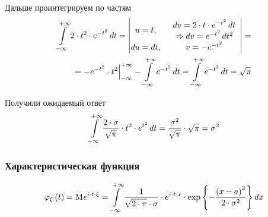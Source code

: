 Дальше проинтегрируем по частям
\begin{align*}
    \integral{-\infty}{+\infty}{t}{2 \cdot t^2 \cdot e^{-t^2}}
    = \begin{vmatrix}
        u = t, & \begin{array}{c}
            dv = 2 \cdot t \cdot e^{-t^2} \, dt\\
            \Rightarrow
                dv = e^{-t^2} \, dt^2
           \end{array}\\
        du = dt, & v = - e^{-t^2}
    \end{vmatrix} = \\
    = \Bigl. - e^{-t^2} \cdot t^2 \Bigr|_{-\infty}^{+\infty}
        - \integral{-\infty}{+\infty}{t}{e^{-t^2}}
    = \integral{-\infty}{+\infty}{t}{e^{-t^2}}
    = \sqrt{\pi}
\end{align*}

Получили ожидаемый ответ
$$\integral{-\infty}{+\infty}{t}{
    \frac{2 \cdot \sigma}{\sqrt{\pi}}
    \cdot t^2 \cdot e^{t^2}}
    = \frac{\sigma^2}{\sqrt{\pi}} \cdot \sqrt{\pi}
    = \sigma^2$$


\subsubsection{Характеристическая функция}
$$\varphi_{\xi}\left( t \right)
    = \mean{e^{i \cdot t \cdot \xi}}
    = \integral{-\infty}{+\infty}{x}{
        \frac{1}{\sqrt{2 \cdot \pi} \cdot \sigma}
            \cdot e^{i \cdot t \cdot x}
            \cdot \exp{\left\{
                -\frac{\left( x-a \right)^2}{2 \cdot \sigma^2} \right\}}}$$

